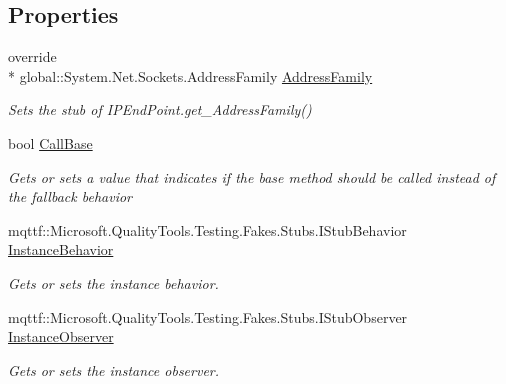 \subsection*{Properties}
\begin{DoxyCompactItemize}
\item 
override \\*
global\-::\-System.\-Net.\-Sockets.\-Address\-Family \hyperlink{class_system_1_1_net_1_1_fakes_1_1_stub_i_p_end_point_aaf16d73ecc12baaac2f88b1ca6d937d1}{Address\-Family}
\begin{DoxyCompactList}\small\item\em Sets the stub of I\-P\-End\-Point.\-get\-\_\-\-Address\-Family()\end{DoxyCompactList}\item 
bool \hyperlink{class_system_1_1_net_1_1_fakes_1_1_stub_i_p_end_point_a7933f420054416c267a29bbfa5c81928}{Call\-Base}
\begin{DoxyCompactList}\small\item\em Gets or sets a value that indicates if the base method should be called instead of the fallback behavior\end{DoxyCompactList}\item 
mqttf\-::\-Microsoft.\-Quality\-Tools.\-Testing.\-Fakes.\-Stubs.\-I\-Stub\-Behavior \hyperlink{class_system_1_1_net_1_1_fakes_1_1_stub_i_p_end_point_add5821d9613606d1a2f5d1b63557b7d4}{Instance\-Behavior}
\begin{DoxyCompactList}\small\item\em Gets or sets the instance behavior.\end{DoxyCompactList}\item 
mqttf\-::\-Microsoft.\-Quality\-Tools.\-Testing.\-Fakes.\-Stubs.\-I\-Stub\-Observer \hyperlink{class_system_1_1_net_1_1_fakes_1_1_stub_i_p_end_point_a3fe786f344f54ab3e30479264c7ecdd9}{Instance\-Observer}
\begin{DoxyCompactList}\small\item\em Gets or sets the instance observer.\end{DoxyCompactList}\end{DoxyCompactItemize}


